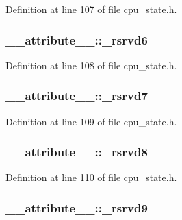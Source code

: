 \-Definition at line 107 of file cpu\-\_\-state.\-h.

\hypertarget{struct____attribute_____a2292fc67100e37f69126a45658c4274c}{
\subsubsection[{\-\_\-rsrvd6}]{ {\bf \-\_\-\-\_\-attribute\-\_\-\-\_\-\-::\-\_\-rsrvd6}}}\label{struct____attribute_____a2292fc67100e37f69126a45658c4274c}


\-Definition at line 108 of file cpu\-\_\-state.\-h.

\hypertarget{struct____attribute_____a862aa7d53327b3a2ba26aa2a1232047d}{
\subsubsection[{\-\_\-rsrvd7}]{ {\bf \-\_\-\-\_\-attribute\-\_\-\-\_\-\-::\-\_\-rsrvd7}}}\label{struct____attribute_____a862aa7d53327b3a2ba26aa2a1232047d}


\-Definition at line 109 of file cpu\-\_\-state.\-h.

\hypertarget{struct____attribute_____a5bc31ac6e4af4ee7892da4b2a0c003fe}{
\subsubsection[{\-\_\-rsrvd8}]{ {\bf \-\_\-\-\_\-attribute\-\_\-\-\_\-\-::\-\_\-rsrvd8}}}\label{struct____attribute_____a5bc31ac6e4af4ee7892da4b2a0c003fe}


\-Definition at line 110 of file cpu\-\_\-state.\-h.

\hypertarget{struct____attribute_____a800e0bb036deefbf40a4428936f2f158}{
\subsubsection[{\-\_\-rsrvd9}]{ {\bf \-\_\-\-\_\-attribute\-\_\-\-\_\-\-::\-\_\-rsrvd9}}}\label{struct____attribute_____a800e0bb036deefbf40a4428936f2f158}



